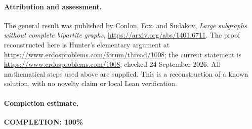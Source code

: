 \paragraph{Attribution and assessment.}
The general result was published by Conlon, Fox, and Sudakov, \emph{Large subgraphs without complete bipartite graphs}, \url{https://arxiv.org/abs/1401.6711}. The proof reconstructed here is Hunter's elementary argument at \url{https://www.erdosproblems.com/forum/thread/1008}; the current statement is \url{https://www.erdosproblems.com/1008}, checked 24 September 2026. All mathematical steps used above are supplied. This is a reconstruction of a known solution, with no novelty claim or local Lean verification.

\paragraph{Completion estimate.}
\textbf{COMPLETION: 100\%}
